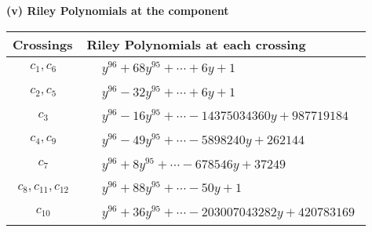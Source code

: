 \documentclass[1p]{elsarticle_modified}
\theoremstyle{definition}
\begin{document}
\flushleft \textbf{(v) Riley Polynomials at the component}\newline \\
\begin{tabular}{m{50pt}|m{274pt}}
Crossings & \hspace{64pt}Riley Polynomials at each crossing \\
\hline $$\begin{aligned}c_{1},c_{6}\end{aligned}$$&$\begin{aligned}
&y^{96}+68 y^{95}+\cdots+6 y+1
\end{aligned}$\\
\hline $$\begin{aligned}c_{2},c_{5}\end{aligned}$$&$\begin{aligned}
&y^{96}-32 y^{95}+\cdots+6 y+1
\end{aligned}$\\
\hline $$\begin{aligned}c_{3}\end{aligned}$$&$\begin{aligned}
&y^{96}-16 y^{95}+\cdots-14375034360 y+987719184
\end{aligned}$\\
\hline $$\begin{aligned}c_{4},c_{9}\end{aligned}$$&$\begin{aligned}
&y^{96}-49 y^{95}+\cdots-5898240 y+262144
\end{aligned}$\\
\hline $$\begin{aligned}c_{7}\end{aligned}$$&$\begin{aligned}
&y^{96}+8 y^{95}+\cdots-678546 y+37249
\end{aligned}$\\
\hline $$\begin{aligned}c_{8},c_{11},c_{12}\end{aligned}$$&$\begin{aligned}
&y^{96}+88 y^{95}+\cdots-50 y+1
\end{aligned}$\\
\hline $$\begin{aligned}c_{10}\end{aligned}$$&$\begin{aligned}
&y^{96}+36 y^{95}+\cdots-203007043282 y+420783169
\end{aligned}$\\
\hline
\end{tabular}\\~\\
\end{document}
